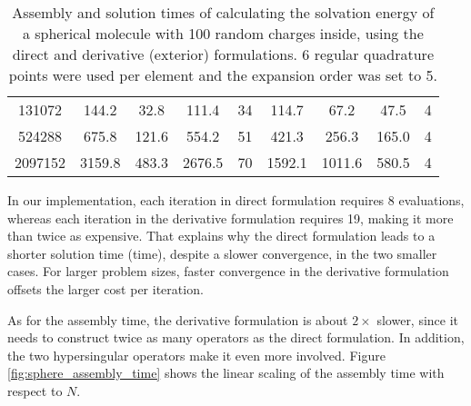 \begin{table*}[]
\begin{tabular}{c|cccc|cccc}
    131072                                                       & 144.2                                                    & 32.8                                                        & 111.4                                                    & 34            & 114.7                                                    & 67.2                                                        & 47.5                                                     & 4            \\
    524288                                                       & 675.8                                                    & 121.6                                                       & 554.2                                                    & 51            & 421.3                                                    & 256.3                                                       & 165.0                                                    & 4            \\
    2097152                                                      & 3159.8                                                   & 483.3                                                       & 2676.5                                                   & 70            & 1592.1                                                   & 1011.6                                                      & 580.5                                                    & 4           
    \end{tabular}
    \caption{Assembly and solution times of calculating the solvation energy of a spherical molecule with 100 random charges inside, using the direct and derivative (exterior) formulations.
    6 regular quadrature points were used per element and the \fmm expansion order was set to 5.}
    \label{tab:sphere_time}
\end{table*}

In our implementation, each iteration in direct formulation requires $8$ \fmm evaluations, whereas each iteration in the derivative formulation requires 19, making it more than twice as expensive.
That explains why the direct formulation leads to a shorter solution time (\gmres time), despite a slower convergence, in the two smaller cases.
For larger problem sizes, faster convergence in the derivative formulation offsets the larger cost per iteration.

As for the assembly time, the derivative formulation is about $2\times$ slower, since it needs to construct twice as many operators as the direct formulation.
In addition, the two hypersingular operators make it even more involved.
Figure \ref{fig:sphere_assembly_time} shows the linear scaling of the assembly time with respect to $N$.

